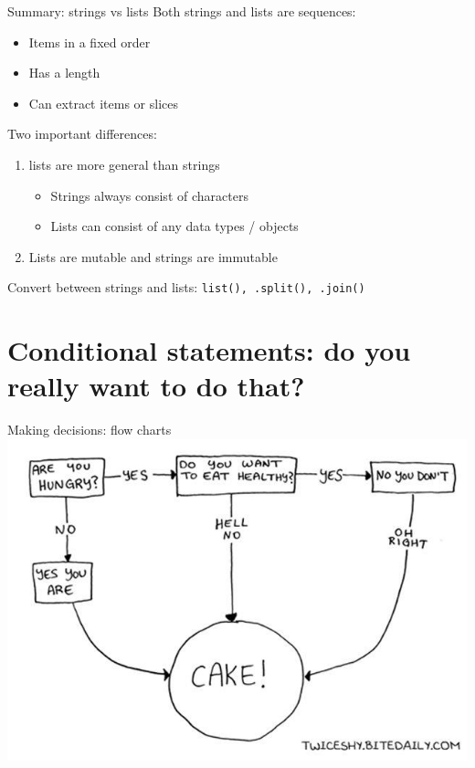 \documentclass[aspectratio=169,usenames,dvipsnames]{beamer}
\begin{document}
\begin{frame}[fragile]{Summary: strings vs lists}
Both strings and lists are sequences:
    \begin{itemize}
        \item Items in a fixed order
        \item Has a length
        \item Can extract items or slices
    \end{itemize}

Two important differences:
\begin{enumerate}
    \item lists are more general than strings
        \begin{itemize}
            \item Strings always consist of characters
            \item Lists can consist of any data types / objects
        \end{itemize}
    \item Lists are mutable and strings are immutable
\end{enumerate}

    Convert between strings and lists:
        \texttt{list(), .split(), .join()}
\end{frame}







\section{Conditional statements: do you really want to do that?}
\frame{\tableofcontents[currentsection]}

\begin{frame}{Making decisions: flow charts}
    \includegraphics[height=0.8\textheight]{fig/flowchart}
\end{frame}
\end{document}
